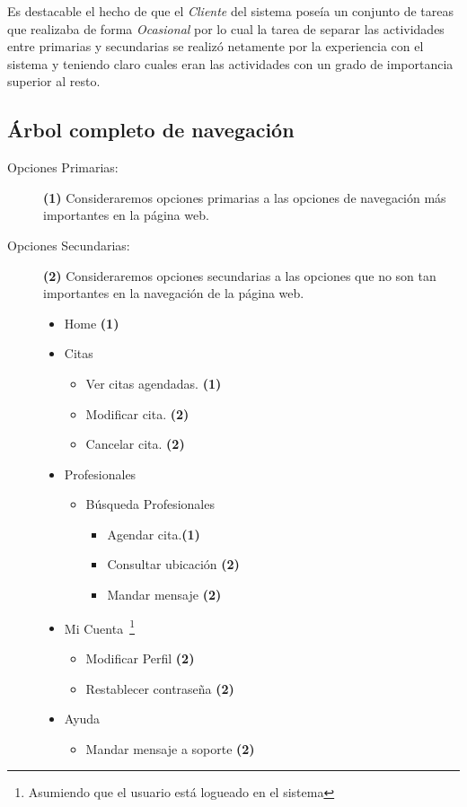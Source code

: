 \documentclass[letter, 10pt]{article}
\begin{document}
Es destacable el hecho de que el \emph{Cliente} del sistema poseía un conjunto de tareas que realizaba de forma
\emph{Ocasional} por lo cual la tarea de separar las actividades entre primarias y secundarias se realizó netamente
por la experiencia con el sistema y teniendo claro cuales eran las actividades con un grado de importancia superior
al resto.

\subsection{Árbol completo de navegación}
\begin{description}
	\item[Opciones Primarias:] \textbf{(1)} Consideraremos opciones primarias a las opciones de navegación
		más importantes en la página web.
	\item[Opciones Secundarias:] \textbf{(2)} Consideraremos opciones secundarias a las opciones que no son
		tan importantes en la navegación de la página web.
	\begin{itemize}
		\item Home \textbf{(1)} 
		\item Citas
		\begin{itemize}
			\item Ver citas agendadas. \textbf{(1)}
			\item Modificar cita. \textbf{(2)}
			\item Cancelar cita.  \textbf{(2)} 
		\end{itemize}
		\item Profesionales
		\begin{itemize}
			\item Búsqueda Profesionales
			\begin{itemize}
				\item Agendar cita.\textbf{(1)} 
				\item Consultar ubicación  \textbf{(2)}
				\item Mandar mensaje  \textbf{(2)}
			\end{itemize}
		\end{itemize}
		\item Mi Cuenta~\footnote{Asumiendo que el usuario está logueado en el sistema}
		\begin{itemize}
			\item Modificar Perfil  \textbf{(2)}
			\item Restablecer contraseña  \textbf{(2)}
		\end{itemize}
		\item Ayuda
		\begin{itemize}
			\item Mandar mensaje a soporte  \textbf{(2)}
		\end{itemize}
	\end{itemize}
\end{description}
%
%
\end{document}
